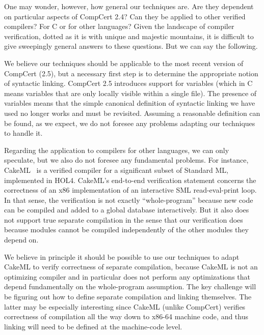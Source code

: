 One may wonder, however, how general our techniques are.  Are they
dependent on particular aspects of CompCert 2.4?  Can they be applied
to other verified compilers?  For C or for other languages?  Given the
landscape of compiler verification, dotted as it is with unique and
majestic mountains, it is difficult to give sweepingly general answers
to these questions.  But we can say the following.

We believe our techniques should be applicable to the most recent
version of CompCert (2.5), but a necessary first step is to determine
the appropriate notion of syntactic linking.  CompCert 2.5 introduces
support for  variables (which in C means variables that are
only locally visible within a single file).  The presence of
 variables means that the simple canonical definition of
syntactic linking we have used no longer works and must be revisited.
Assuming a reasonable definition can be found, as we expect, we do not
foresee any problems adapting our techniques to handle it.

Regarding the application to compilers for other languages, we can
only speculate, but we also do not foresee any fundamental problems.
For instance, CakeML~\cite{cakeml} is a verified compiler for a
significant subset of Standard ML, implemented in HOL4.  CakeML's
end-to-end verification statement concerns the correctness of an x86
implementation of an interactive SML read-eval-print loop.  In that
sense, the verification is not exactly ``whole-program'' because new
code can be compiled and added to a global database interactively.
But it also does not support true separate compilation in the sense
that our verification does because modules cannot be compiled independently
of the other modules they depend on.

We believe in principle it should be possible to use our techniques to
adapt CakeML to verify correctness of separate compilation, because
CakeML is not an optimizing compiler and in particular does not
perform any optimizations that depend fundamentally on the
whole-program assumption.  The key challenge will be figuring out how
to define separate compilation and linking themselves.  The latter may
be especially interesting since CakeML (unlike CompCert) verifies
correctness of compilation all the way down to x86-64 machine code,
and thus linking will need to be defined at the machine-code level.


